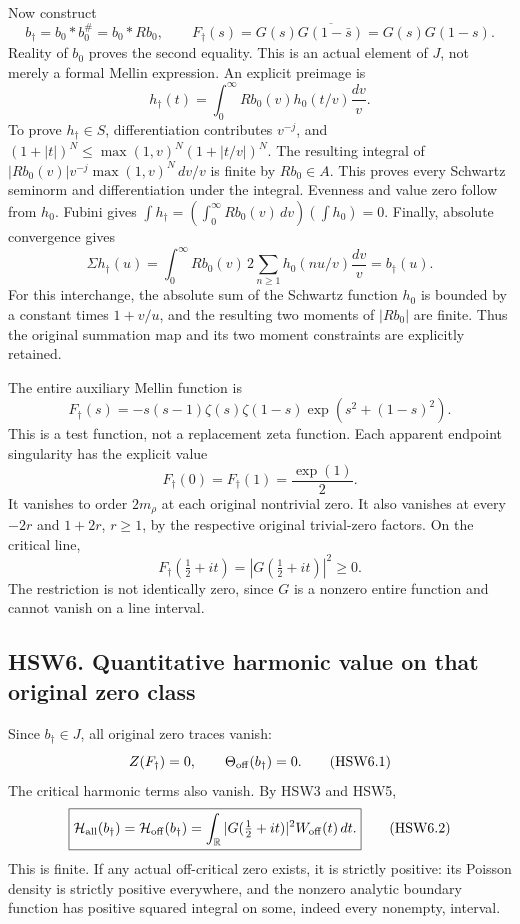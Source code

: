 Now construct \[
b_\dagger=b_0*b_0^\#=b_0*Rb_0,\qquad
F_\dagger(s)=G(s)\overline{G(1-\bar s)}=G(s)G(1-s).
\tag{HSW5.5}
\] Reality of \(b_0\) proves the second equality. This is an actual
element of \(J\), not merely a formal Mellin expression. An explicit
preimage is \[
h_\dagger(t)=\int_0^\infty Rb_0(v)h_0(t/v)\frac{dv}{v}.
\tag{HSW5.6}
\] To prove \(h_\dagger\in S\), differentiation contributes \(v^{-j}\),
and \((1+|t|)^N\le\max(1,v)^N(1+|t/v|)^N\). The resulting integral of
\(|Rb_0(v)|v^{-j}\max(1,v)^N\,dv/v\) is finite by \(Rb_0\in A\). This
proves every Schwartz seminorm and differentiation under the integral.
Evenness and value zero follow from \(h_0\). Fubini gives
\(\int h_\dagger=(\int_0^\infty Rb_0(v)\,dv)(\int h_0)=0\). Finally,
absolute convergence gives \[
\Sigma h_\dagger(u)=
\int_0^\infty Rb_0(v)\,2\sum_{n\ge1}h_0(nu/v)\frac{dv}{v}
=b_\dagger(u).
\tag{HSW5.7}
\] For this interchange, the absolute sum of the Schwartz function
\(h_0\) is bounded by a constant times \(1+v/u\), and the resulting two
moments of \(|Rb_0|\) are finite. Thus the original summation map and
its two moment constraints are explicitly retained.

The entire auxiliary Mellin function is \[
\boxed{F_\dagger(s)=
-s(s-1)\zeta(s)\zeta(1-s)
\exp\!\left(s^2+(1-s)^2\right).}
\tag{HSW5.8}
\] This is a test function, not a replacement zeta function. Each
apparent endpoint singularity has the explicit value \[
F_\dagger(0)=F_\dagger(1)=\frac{\exp(1)}2.
\tag{HSW5.9}
\] It vanishes to order \(2m_\rho\) at each original nontrivial zero. It
also vanishes at every \(-2r\) and \(1+2r\), \(r\ge1\), by the
respective original trivial-zero factors. On the critical line, \[
F_\dagger(\tfrac12+it)=|G(\tfrac12+it)|^2\ge0.
\tag{HSW5.10}
\] The restriction is not identically zero, since \(G\) is a nonzero
entire function and cannot vanish on a line interval.

\subsection{HSW6. Quantitative harmonic value on that original zero
class}\label{hsw6.-quantitative-harmonic-value-on-that-original-zero-class}

Since \(b_\dagger\in J\), all original zero traces vanish: \[
Z(F_\dagger)=0,\qquad \Theta_{\rm off}(b_\dagger)=0.
\tag{HSW6.1}
\] The critical harmonic terms also vanish. By HSW3 and HSW5, \[
\boxed{\mathcal H_{\rm all}(b_\dagger)
=\mathcal H_{\rm off}(b_\dagger)
=\int_{\mathbb R}|G(\tfrac12+it)|^2W_{\rm off}(t)\,dt.}
\tag{HSW6.2}
\] This is finite. If any actual off-critical zero exists, it is
strictly positive: its Poisson density is strictly positive everywhere,
and the nonzero analytic boundary function has positive squared integral
on some, indeed every nonempty, interval.

